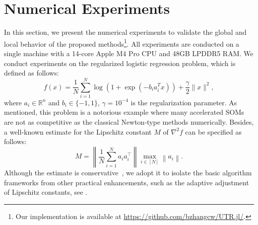 \documentclass{article}
\numberwithin{equation}{section}
\numberwithin{equation}{section}
\begin{document}
\section{Numerical Experiments}\label{sec.experiments}
In this section, we present the numerical experiments to validate the global and local behavior of the proposed methods\footnote{Our implementation is available at \url{https://github.com/bzhangcw/UTR.jl/}.}. All experiments are conducted on a single machine with a 14-core Apple M4 Pro CPU and 48GB LPDDR5 RAM.
We conduct experiments on the regularized logistic regression problem, which is defined as follows:
\begin{equation}
    \label{eq.logistic regression}
    f(x) = \frac{1}{N} \sum_{i=1}^N \log (1 + \exp (-b_i a_i^T x)) + \frac{\gamma}{2}\|x\|^2,
\end{equation}
where $a_i \in \mathbb{R}^n$ and $b_i \in \{-1, 1\}$, $\gamma = 10^{-4}$ is the regularization parameter.
As mentioned, this problem is a notorious example where many accelerated SOMs are not as competitive as the classical Newton-type methods \cite{carmon2022optimal,chen2022accelerating,zhang2012on} numerically.
Besides, a well-known estimate for the Lipschitz constant $\widehat M$ of $\nabla^2 f$ can be specified as follows:
$$\widehat M = \left\|\frac{1}{N} \sum_{i=1}^N a_i a_i^{\top}\right\| \max _{i \in[N]}\left\|a_i\right\|.$$
Although the estimate is conservative~\cite{song2021unified}, we adopt it to isolate the basic algorithm frameworks from other practical enhancements, such as the adaptive adjustment of Lipschitz constants, see \cite{mishchenko2023regularized,cartis2011adaptive}.
\end{document}
